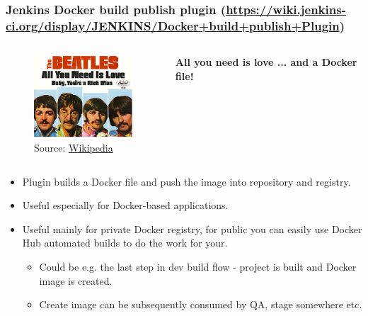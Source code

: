\documentclass[10pt,utf8]{beamer}
\begin{document}
\begin{frame}
	\frametitle{Jenkins Docker build publish plugin \scriptsize{(\href{https://wiki.jenkins-ci.org/display/JENKINS/Docker+build+publish+Plugin}{https://wiki.jenkins-ci.org/display/JENKINS/Docker+build+publish+Plugin})}}
	\begin{columns}
		\begin{figure}
			\centering
			\hspace{-1cm}
			\includegraphics[width=4cm]{./img/All_You_Need_Is_Love.eps}
			\vspace{-0.5cm}
			\caption{\tiny{Source: \href{http://en.wikipedia.org/wiki/All_You_Need_Is_Love\#mediaviewer/File:All_You_Need_Is_Love_(Beatles_single_-_cover_art).jpg}{Wikipedia}}}
		\end{figure}
		
		\Large{\textbf{All you need is love ... and a Docker file!}}
	\end{columns}
	
	\begin{itemize}
		\item Plugin builds a Docker file and push the image into repository and registry.
		\item Useful especially for Docker-based applications.
		\item Useful mainly for private Docker registry, for public you can easily use Docker Hub automated builds to do the work for your.
		\begin{itemize}
			\item Could be e.g. the last step in dev build flow - project is built and Docker image is created.
			\item Create image can be subsequently consumed by QA, stage somewhere etc.
		\end{itemize}
	\end{itemize}
\end{frame}
\end{document}
